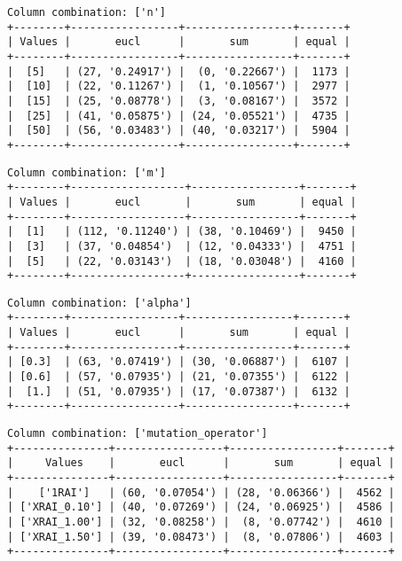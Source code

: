 \documentclass{article}
\begin{document}
\begin{verbatim}
Column combination: ['n']
+--------+-----------------+-----------------+-------+
| Values |       eucl      |       sum       | equal |
+--------+-----------------+-----------------+-------+
|  [5]   | (27, '0.24917') |  (0, '0.22667') |  1173 |
|  [10]  | (22, '0.11267') |  (1, '0.10567') |  2977 |
|  [15]  | (25, '0.08778') |  (3, '0.08167') |  3572 |
|  [25]  | (41, '0.05875') | (24, '0.05521') |  4735 |
|  [50]  | (56, '0.03483') | (40, '0.03217') |  5904 |
+--------+-----------------+-----------------+-------+
\end{verbatim}

\begin{verbatim}
Column combination: ['m']
+--------+------------------+-----------------+-------+
| Values |       eucl       |       sum       | equal |
+--------+------------------+-----------------+-------+
|  [1]   | (112, '0.11240') | (38, '0.10469') |  9450 |
|  [3]   | (37, '0.04854')  | (12, '0.04333') |  4751 |
|  [5]   | (22, '0.03143')  | (18, '0.03048') |  4160 |
+--------+------------------+-----------------+-------+
\end{verbatim}

\begin{verbatim}
Column combination: ['alpha']
+--------+-----------------+-----------------+-------+
| Values |       eucl      |       sum       | equal |
+--------+-----------------+-----------------+-------+
| [0.3]  | (63, '0.07419') | (30, '0.06887') |  6107 |
| [0.6]  | (57, '0.07935') | (21, '0.07355') |  6122 |
|  [1.]  | (51, '0.07935') | (17, '0.07387') |  6132 |
+--------+-----------------+-----------------+-------+
\end{verbatim}

\begin{verbatim}
Column combination: ['mutation_operator']
+---------------+-----------------+-----------------+-------+
|     Values    |       eucl      |       sum       | equal |
+---------------+-----------------+-----------------+-------+
|    ['1RAI']   | (60, '0.07054') | (28, '0.06366') |  4562 |
| ['XRAI_0.10'] | (40, '0.07269') | (24, '0.06925') |  4586 |
| ['XRAI_1.00'] | (32, '0.08258') |  (8, '0.07742') |  4610 |
| ['XRAI_1.50'] | (39, '0.08473') |  (8, '0.07806') |  4603 |
+---------------+-----------------+-----------------+-------+
\end{verbatim}
\end{document}
